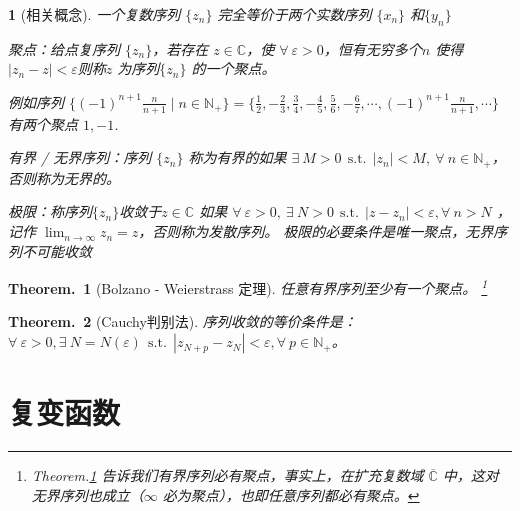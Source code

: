 \documentclass[UTF8]{report}
\def\C{\mathbb{C}}
\theoremstyle{MyLineTheoremStyle} %
\newtheorem{LineTheorem}{Theorem.\,}
\theoremstyle{MyBlockTheoremStyle} %
\theoremstyle{MySubsubsectionStyle} %
\newtheorem{definition}{}
\begin{document}
\begin{definition}[相关概念]
    一个复数序列 $\{z_n\}$ 完全等价于两个实数序列 $\{x_n\}$ 和$\{y_n\}$
    \begin{circledenum}
        \item 聚点：给点复序列 $\{z_n\}$，若存在 $z \in \C$，使 $\forall\ \varepsilon >0$，恒有无穷多个$n$ 使得 $| z_n - z | < \varepsilon$则称$z$ 为序列$\{z_n\}$ 的一个聚点。
        {\par\color{gray}\small
        例如序列 $\{(-1)^{n+1}\frac n{n+1}\mid n \in \mathbb{N}_+\} =  \{\frac12,-\frac23,\frac34,-\frac45,\frac56,-\frac67,\cdots,(-1)^{n+1}\frac n{n+1},\cdots \}$ 有两个聚点 $1,-1$.
        \par}
        \item 有界 / 无界序列：序列 $\{z_n\}$ 称为有界的如果 $\exists\ M>0 \ \ \text{s.t.}\ \ | z_n | < M,\ \forall\ n \in \mathbb{N}_+$，否则称为无界的。
        \item 极限：称序列$\{z_n\}$收敛于$z \in \C$ 如果 $ \forall\ \varepsilon > 0,\ \exists\ N>0 \ \ \text{s.t.}\ \ | z - z_n | < \varepsilon, \forall\ n > N$ ，记作 $\displaystyle \lim_{n \rightarrow \infty} z_n = z $，否则称为发散序列。
        极限的必要条件是唯一聚点，无界序列不可能收敛
    \end{circledenum}
\end{definition}

\begin{LineTheorem}[Bolzano - Weierstrass 定理]\label{Bolzano - Weierstrass 定理}
任意有界序列至少有一个聚点。
\footnote{
    Theorem.\ref{Bolzano - Weierstrass 定理} 告诉我们有界序列必有聚点，事实上，在扩充复数域 $\overline{\C}$ 中，这对无界序列也成立（$\infty$ 必为聚点），也即任意序列都必有聚点。}
\end{LineTheorem}

\begin{LineTheorem}[Cauchy判别法]\label{Cauchy判别法}
序列收敛的等价条件是：$\forall\ \varepsilon > 0, \exists\ N = N(\varepsilon) \ \ \text{s.t.}\ \ | z_{N+p} - z_N | < \varepsilon, \forall\ p \in \mathbb{N}_+$。
\end{LineTheorem}

\section{复变函数}
\end{document}
